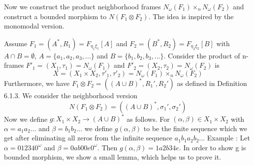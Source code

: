 \documentclass[12pt, a4paper]{scrartcl}
\begin{document}
    Now we construct the product neighborhood frames $N_\omega(F_1) \times_n N_\omega(F_2)$ and construct a bounded morphism to $N(F_1 \otimes F_2)$. 
    The idea is inspired by the monomodal version. \newline

    Assume $F_1 = (A^*,R_1) = F_{\eta_1 \xi_1}[A]$ and $F_2 = (B^*,R_2) = F_{\eta_2 \xi_2}[B]$ 
    with $A \cap B = \emptyset$, $A = \{a_1,a_2,a_3,...\}$ and $B = \{b_1,b_2,b_3,...\}$. 
    Consider the product of n-frames $F'_1 = (X_1, \tau_1) = N_\omega(F_1)$ and $F'_2 = (X_2, \tau_2) = N_\omega(F_2)$ is 
    $$X = (X_1 \times X_2, \tau'_1, \tau'_2) = N_\omega(F_1) \times_n N_\omega(F_2)$$ 
    Furthermore, we have $F_1 \otimes F_2 = ((A \cup B)^*, R_1', R_2')$ as defined in Definition 6.1.3.
    We consider the neighborhood version $$N(F_1 \otimes F_2) = ((A \cup B)^*, \sigma_1', \sigma_2')$$ 
    Now we define $g : X_1 \times X_2 \rightarrow (A \cup B)^*$ as follows. For $(\alpha, \beta) \in X_1 \times X_2$ with $\alpha = a_1a_2...$ and $\beta = b_1b_2...$
    we define $g(\alpha,\beta)$ to be the finite sequence which we get after eliminating all zeros from the infinite sequence
    $a_1b_1a_2b_2...$ \newline \newline
    Example : Let $\alpha = 012340^\omega$  and $\beta = 0ab00e0^\omega$. Then $g(\alpha, \beta) = 1a2b34e$. \newline
    \newline
    In order to show g is bounded morphism, we show a small lemma, which helps us to prove it.
\end{document}
